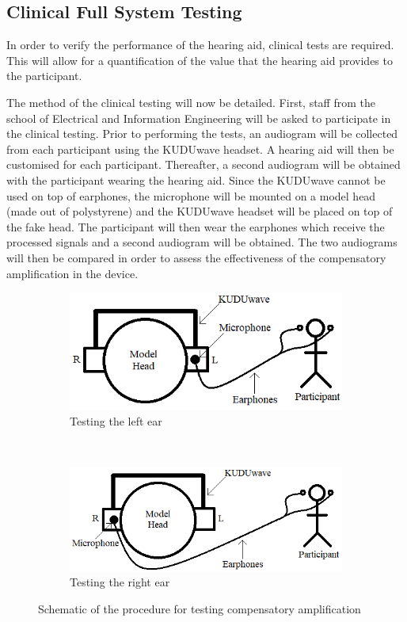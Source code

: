 \documentclass[10pt,twocolumn]{witseiepaper}
\begin{document}
\subsection{Clinical Full System Testing} \label{sec:clinical}
In order to verify the performance of the hearing aid, clinical tests are required. This will allow for a quantification of the value that the hearing aid provides to the participant.

The method of the clinical testing will now be detailed. First, staff from the school of Electrical and Information Engineering will be asked to participate in the clinical testing. Prior to performing the tests, an audiogram will be collected from each participant using the KUDUwave headset. A hearing aid will then be customised for each participant. Thereafter, a second audiogram will be obtained with the participant wearing the hearing aid. Since the KUDUwave cannot be used on top of earphones, the microphone will be mounted on a model head (made out of polystyrene) and the KUDUwave headset will be placed on top of the fake head. The participant will then wear the earphones which receive the processed signals and a second audiogram will be obtained. The two audiograms will then be compared in order to assess the effectiveness of the compensatory amplification in the device.

\begin{figure}[h]
	\centering
	\begin{subfigure}[t]{0.5\textwidth}
		\centering
		\includegraphics[width=0.8\columnwidth]{gainTestingLeft.png}
		\caption{Testing the left ear}
	\end{subfigure}%
	\\
	\begin{subfigure}[t]{0.5\textwidth}
		\centering
		\includegraphics[width=0.8\columnwidth]{gainTestingRight.png}
		\caption{Testing the right ear}
	\end{subfigure}
	\caption{Schematic of the procedure for testing compensatory amplification}
	\label{fig:testing}	
\end{figure}
\end{document}
